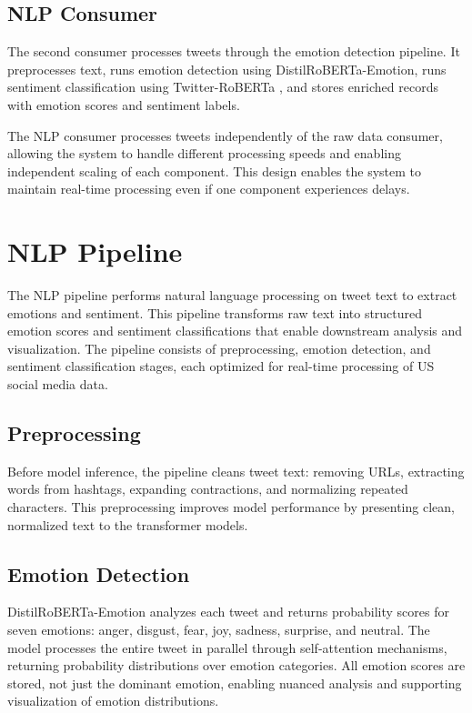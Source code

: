 \subsection{NLP Consumer}

The second consumer processes tweets through the emotion detection pipeline. It preprocesses text, runs emotion detection using DistilRoBERTa-Emotion, runs sentiment classification using Twitter-RoBERTa \cite{cardiffnlp2023sentiment}, and stores enriched records with emotion scores and sentiment labels.

The NLP consumer processes tweets independently of the raw data consumer, allowing the system to handle different processing speeds and enabling independent scaling of each component. This design enables the system to maintain real-time processing even if one component experiences delays.


\section{NLP Pipeline}

The NLP pipeline performs natural language processing on tweet text to extract emotions and sentiment. This pipeline transforms raw text into structured emotion scores and sentiment classifications that enable downstream analysis and visualization. The pipeline consists of preprocessing, emotion detection, and sentiment classification stages, each optimized for real-time processing of US social media data.

\subsection{Preprocessing}

Before model inference, the pipeline cleans tweet text: removing URLs, extracting words from hashtags, expanding contractions, and normalizing repeated characters. This preprocessing improves model performance by presenting clean, normalized text to the transformer models.

\subsection{Emotion Detection}

DistilRoBERTa-Emotion analyzes each tweet and returns probability scores for seven emotions: anger, disgust, fear, joy, sadness, surprise, and neutral. The model processes the entire tweet in parallel through self-attention mechanisms, returning probability distributions over emotion categories. All emotion scores are stored, not just the dominant emotion, enabling nuanced analysis and supporting visualization of emotion distributions.

